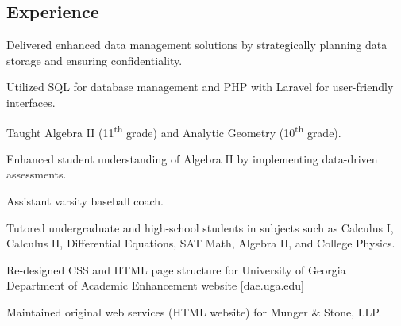 \documentclass[]{plushcv}
\begin{document}
\begin{paracol}{2}

\section{Experience}
\begin{tightemize}
\item Delivered enhanced data management solutions by strategically planning data storage and ensuring confidentiality.
\item Utilized SQL for database management and PHP with Laravel for user-friendly interfaces.
\end{tightemize}
\sectionsep

\begin{tightemize}
\item Taught Algebra II (11\textsuperscript{th} grade) and Analytic Geometry (10\textsuperscript{th} grade).
\item Enhanced student understanding of Algebra II by implementing data-driven assessments.
\item Assistant varsity baseball coach.
\end{tightemize}
\sectionsep

\begin{tightemize}
	\item Tutored undergraduate and high-school students in subjects such as Calculus I, Calculus II, Differential Equations, SAT Math, Algebra II, and College Physics.
	\item Re-designed CSS and HTML page structure for University of Georgia Department of Academic Enhancement website [dae.uga.edu]
	\item {Maintained original web services (HTML website) for Munger \& Stone, LLP.}
\end{tightemize}
\sectionsep



\end{paracol}
\end{document}
